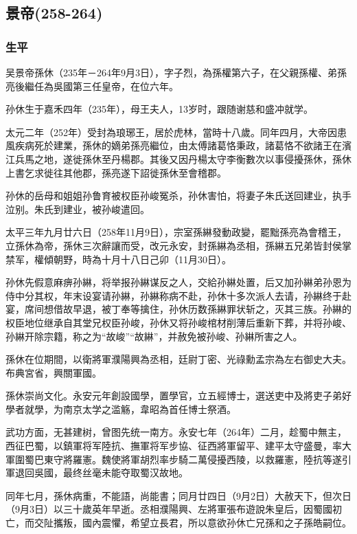 
\subsection{景帝\tiny(258-264)}

\subsubsection{生平}

吴景帝孫休（235年－264年9月3日），字子烈，為孫權第六子，在父親孫權、弟孫亮後繼任為吳國第三任皇帝，在位六年。

孙休生于嘉禾四年（235年），母王夫人，13岁时，跟随谢慈和盛冲就学。

太元二年（252年）受封為琅琊王，居於虎林，當時十八歲。同年四月，大帝因患風疾病死於建業，孫休的嫡弟孫亮繼位，由太傅諸葛恪秉政，諸葛恪不欲諸王在濱江兵馬之地，遂徙孫休至丹楊郡。其後又因丹楊太守李衡數次以事侵擾孫休，孫休上書乞求徙往其他郡，孫亮遂下詔徙孫休至會稽郡。

孙休的岳母和姐姐孙鲁育被权臣孙峻冤杀，孙休害怕，将妻子朱氏送回建业，执手泣别。朱氏到建业，被孙峻遣回。

太平三年九月廿六日（258年11月9日），宗室孫綝發動政變，罷黜孫亮為會稽王，立孫休為帝，孫休三次辭讓而受，改元永安，封孫綝為丞相，孫綝五兄弟皆封侯掌禁军，權傾朝野，時為十月十八日己卯（11月30日）。

孙休先假意麻痹孙綝，将举报孙綝谋反之人，交給孙綝处置，后又加孙綝弟孙恩为侍中分其权，年末设宴请孙綝，孙綝称病不赴，孙休十多次派人去请，孙綝终于赴宴，席间想借故早退，被丁奉等擒住，孙休历数孫綝罪状斩之，灭其三族。孙綝的权臣地位继承自其堂兄权臣孙峻，孙休又将孙峻棺材削薄后重新下葬，并将孙峻、孙綝开除宗籍，称之为“故峻”“故綝”，并赦免被孙峻、孙綝所害之人。

孫休在位期間，以衛將軍濮陽興為丞相，廷尉丁密、光祿勳孟宗為左右御史大夫。布典宮省，興關軍國。

孫休崇尚文化。永安元年創設國學，置學官，立五經博士，選送吏中及將吏子弟好學者就學，为南京太学之滥觞，韋昭為首任博士祭酒。

武功方面，无甚建树，曾图先统一南方。永安七年（264年）二月，趁蜀中無主，西征巴蜀，以鎮軍将军陸抗、撫軍将军步協、征西將軍留平、建平太守盛曼，率大軍圍蜀巴東守將羅憲。魏使將軍胡烈率步騎二萬侵擾西陵，以救羅憲，陸抗等遂引軍退回吳國，最终丝毫未能夺取蜀汉故地。

同年七月，孫休病重，不能語，尚能書；同月廿四日（9月2日）大赦天下，但次日（9月3日）以三十歲英年早逝。丞相濮陽興、左將軍張布遊說朱皇后，因蜀國初亡，而交阯攜叛，國內震懼，希望立長君，所以意欲孙休亡兄孫和之子孫皓嗣位。

